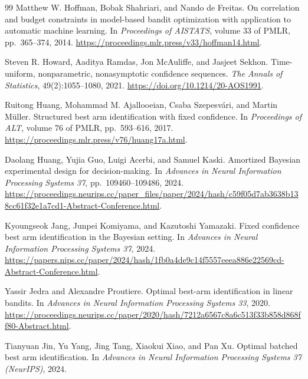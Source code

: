 \documentclass{article}
\theoremstyle{plain}
\theoremstyle{definition}
\begin{document}
\begin{thebibliography}{99}
Matthew W. Hoffman, Bobak Shahriari, and Nando de Freitas.
On correlation and budget constraints in model-based bandit optimization with application to automatic machine learning.
In \emph{Proceedings of AISTATS}, volume 33 of PMLR, pp.\ 365--374, 2014.
\url{https://proceedings.mlr.press/v33/hoffman14.html}.

Steven R. Howard, Aaditya Ramdas, Jon McAuliffe, and Jasjeet Sekhon.
Time-uniform, nonparametric, nonasymptotic confidence sequences.
\emph{The Annals of Statistics}, 49(2):1055--1080, 2021.
\url{https://doi.org/10.1214/20-AOS1991}.

Ruitong Huang, Mohammad M. Ajallooeian, Csaba Szepesv\'ari, and Martin M\"uller.
Structured best arm identification with fixed confidence.
In \emph{Proceedings of ALT}, volume 76 of PMLR, pp.\ 593--616, 2017.
\url{https://proceedings.mlr.press/v76/huang17a.html}.

Daolang Huang, Yujia Guo, Luigi Acerbi, and Samuel Kaski.
Amortized Bayesian experimental design for decision-making.
In \emph{Advances in Neural Information Processing Systems 37}, pp.\ 109460--109486, 2024.
\url{https://proceedings.neurips.cc/paper_files/paper/2024/hash/c59f05d7ab3638b138cc61f32e1a7cd1-Abstract-Conference.html}.

Kyoungseok Jang, Junpei Komiyama, and Kazutoshi Yamazaki.
Fixed confidence best arm identification in the Bayesian setting.
In \emph{Advances in Neural Information Processing Systems 37}, 2024.
\url{https://papers.nips.cc/paper/2024/hash/1fb0a4de9c14f5557eeea886e22569cd-Abstract-Conference.html}.

Yassir Jedra and Alexandre Proutiere.
Optimal best-arm identification in linear bandits.
In \emph{Advances in Neural Information Processing Systems 33}, 2020.
\url{https://proceedings.neurips.cc/paper/2020/hash/7212a6567c8a6c513f33b858d868ff80-Abstract.html}.

Tianyuan Jin, Yu Yang, Jing Tang, Xiaokui Xiao, and Pan Xu.
Optimal batched best arm identification.
In \emph{Advances in Neural Information Processing Systems 37 (NeurIPS)}, 2024.


\end{thebibliography}
\end{document}
